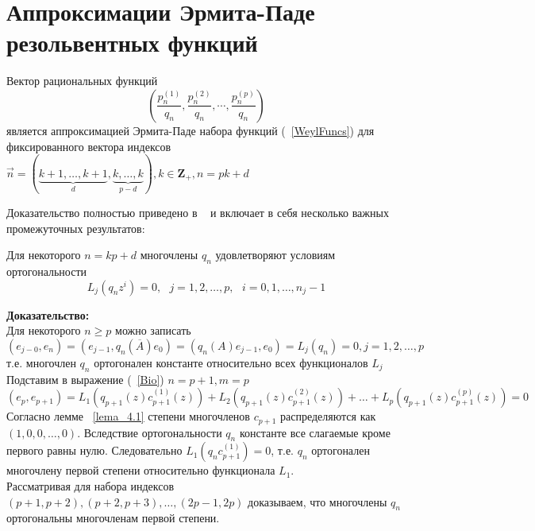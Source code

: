\section{Аппроксимации Эрмита-Паде резольвентных функций}
\begin{teor}
Вектор рациональных функций
$$%
\left( \frac {p^{(1)}_n} {q_n}, \frac {p^{(2)}_n} {q_n}, \cdots,
\frac {p^{(p)}_n} {q_n} \right)
$$%
является
аппроксимацией Эрмита-Паде набора функций (~\ref{WeylFuncs}) для
фиксированного вектора индексов $\overrightarrow{n}=
(\underbrace{k+1,\ldots,k+1}_{d},\underbrace{k,\ldots,k}_{p-d}),\mbox{
} k\in{\textbf{Z}}_{+},n=pk+d$ \end{teor} Доказательство полностью
приведено в ~\cite{KaliaguineAA} и включает в себя несколько
важных промежуточных результатов: \\
\begin{lema}
\label{lema_4.2} Для некоторого $n=kp+d$ многочлены $q_n$
удовлетворяют условиям ортогональности
$$%
L_j(q_nz^i)=0,\mbox{   }j=1,2,\ldots,p,\mbox{ }i=0,1,\ldots,n_j-1
$$%
\end{lema}
\textbf{Доказательство:} \\
Для некоторого $n \geq p$ можно записать
$$%
(e_{j-0},e_n)=(e_{j-1},q_n(\overline{A})e_0)=(q_n(A)e_{j-1},e_0)=L_j(q_n)=0,j=1,2,\ldots,p
$$%
т.е. многочлен $q_n$ ортогонален константе
относительно всех
функционалов $L_j$ \\
Подставим в выражение (~\ref{Bio}) $n=p+1,m=p$
$$%
(e_p,e_{p+1})
=L_1(q_{p+1}(z)c_{p+1}^{(1)}(z))+L_2(q_{p+1}(z)c_{p+1}^{(2)}(z))+\ldots+L_p(q_{p+1}(z)c_{p+1}^{(p)}(z))=0
$$%
Согласно лемме ~\ref{lema_4.1} степени
многочленов $c_{p+1}$ распределяются как $(1,0,0,\ldots,0)$.
Вследствие ортогональности $q_n$ константе все слагаемые кроме
первого равны нулю. Следовательно $L_1(q_{n}c_{p+1}^{(1)}) = 0$,
т.е. $q_{n}$ ортогонален
многочлену первой степени относительно функционала $L_1$. \\
Рассматривая  для набора индексов
$(p+1,p+2),(p+2,p+3),\ldots,(2p-1,2p)$ доказываем, что многочлены
$q_n$ ортогональны многочленам первой степени. \\
